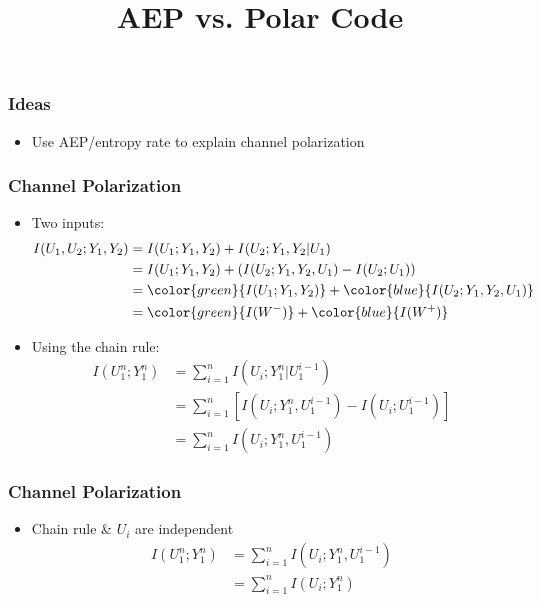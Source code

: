 \documentclass{beamer}
\title{AEP vs. Polar Code}
\begin{document}
\begin{frame}
\titlepage
\end{frame}

\begin{frame}
	\tableofcontents
\end{frame}



\begin{frame}
\frametitle{Ideas}
\begin{itemize}
\item Use AEP/entropy rate to explain channel polarization

\end{itemize}
\end{frame}

\begin{frame}
\frametitle{Channel Polarization}
\begin{itemize}
\item Two inputs:
\begin{align*}
I(U_1,U_2;Y_1,Y_2)
  &= I(U_1;Y_1,Y_2) + I(U_2;Y_1,Y_2|U_1) \\
  &= I(U_1;Y_1,Y_2) + \left( I(U_2;Y_1,Y_2,U_1) - I(U_2;U_1) \right) \\
  &= \color{green}{I(U_1;Y_1,Y_2)} + \color{blue}{I(U_2;Y_1,Y_2,U_1)} \\
  &= \color{green}{I(W^-)} + \color{blue}{I(W^+)}
\end{align*}

\item Using the chain rule:
\begin{align*}
I(U_1^n;Y_1^n)
  &= \sum_{i=1}^n I(U_i;Y_1^n|U_1^{i-1}) \\
  &= \sum_{i=1}^n \left[ I(U_i;Y_1^n,U_1^{i-1}) - I(U_i;U_1^{i-1}) \right] \\
  &= \sum_{i=1}^n I(U_i;Y_1^n,U_1^{i-1})
\end{align*}

\end{itemize}
\end{frame}

\begin{frame}
\frametitle{Channel Polarization}
\begin{itemize}
\item Chain rule \& $U_i$ are independent
\begin{align*}
I(U_1^n;Y_1^n)
  &= \sum_{i=1}^n I(U_i;Y_1^n,U_1^{i-1}) \\
  &= \sum_{i=1}^n I(U_i;Y_1^n)
\end{align*}
\end{itemize}

\end{frame}
\end{document}
